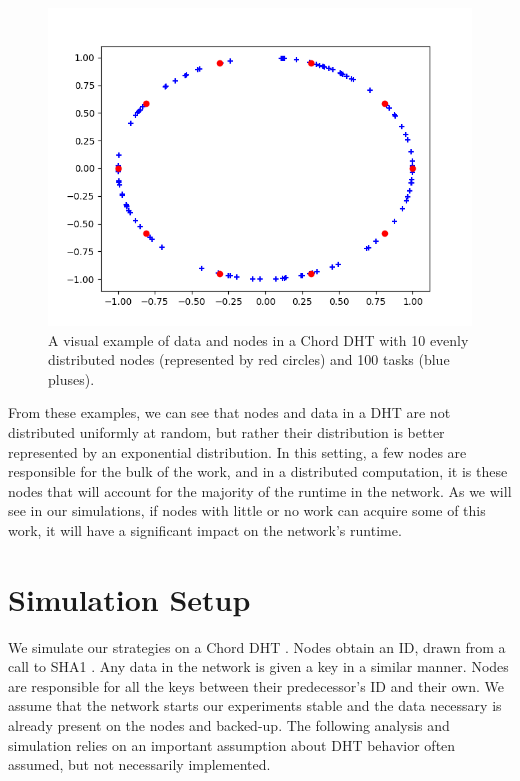 \documentclass[10pt,conference]{IEEEtran}
\begin{document}
\begin{figure}
	\centering
	\includegraphics[width=0.9\linewidth]{figs/exampleChordEvenRedone}
	\caption[Distribution of Tasks in a Chord DHT  with Evenly Distributed Nodes]{A visual example of data and nodes in a Chord DHT with 10 evenly distributed nodes (represented by red circles) and 100 tasks (blue pluses).}
	\label{fig:exampleChordEvenDistribution}
\end{figure}

From these examples, we can see that nodes and data in a DHT are not distributed uniformly at random, but rather their distribution is better represented by  an exponential distribution.
In this setting, a few nodes are responsible for the bulk of the work, and in a distributed computation, it is these nodes that will account for the majority of the runtime in the network.
As we will see in our simulations, if nodes with little or no work can acquire some of this work, it will have a significant impact on the network's runtime.



\section{Simulation Setup}
\label{sec:auto-simulation}



We simulate our strategies on a Chord DHT \cite{chord}.
Nodes obtain an ID, drawn from a call to SHA1 \cite{sha1}.
Any data in the network is given a key in a similar manner.
Nodes are responsible for all the keys between their predecessor's ID and their own.
We assume that the network starts our experiments stable and the data necessary is already present on the nodes and backed-up.
The following analysis and simulation relies on an important assumption about DHT behavior often assumed, but not necessarily implemented.
\end{document}
